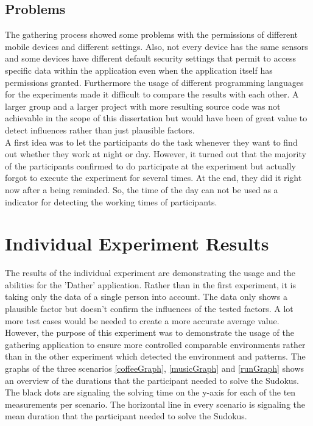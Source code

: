 \subsection{Problems}
The gathering process showed some problems with the permissions of different mobile devices and different settings. Also, not every device has the same sensors and some devices have different default security settings that permit to access specific data within the application even when the application itself has permissions granted. Furthermore the usage of different programming languages for the experiments made it difficult to compare the results with each other. 
A larger group and a larger project with more resulting source code was not achievable in the scope of this dissertation but would have been of great value to detect influences rather than just plausible factors.
\\
A first idea was to let the participants do the task whenever they want to find out whether they work at night or day. However, it turned out that the majority of the participants confirmed to do participate at the experiment but actually forgot to execute the experiment for several times.  At the end,  they did it right now after a being reminded. So, the time of the day can not be used as a indicator for detecting the working times of participants. 

\section{Individual Experiment Results}
The results of the individual experiment are demonstrating the usage and the abilities for the 'Dather' application. Rather than in the first experiment, it is taking only the data of a single person into account.
The data only shows a plausible factor but doesn't confirm the influences of the tested factors. A lot more test cases would be needed to create a more accurate average value. However, the purpose of this experiment was to demonstrate the usage of the gathering application to ensure more controlled comparable environments rather than in the other experiment which detected the environment and patterns. 
\bigbreak
The graphs of the three scenarios \ref{coffeeGraph}, \ref{musicGraph} and \ref{runGraph} shows an overview of the durations that the participant needed to solve the Sudokus. The black dots are signaling the solving time on the y-axis for each of the ten measurements per scenario. The horizontal line in every scenario is signaling the mean duration that the participant needed to solve the Sudokus. 

